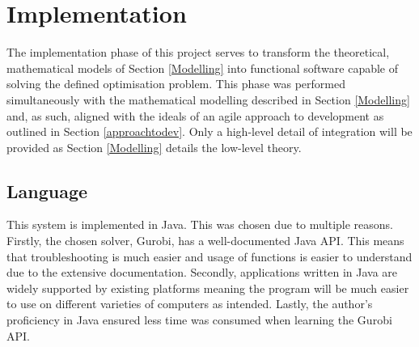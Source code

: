 \chapter{Implementation}\label{implementation}

\ifpdf
    \graphicspath{{Chapter4/Figs/Raster/}{Chapter4/Figs/PDF/}{Chapter4/Figs/}}
\else
    \graphicspath{{Chapter4/Figs/Vector/}{Chapter4/Figs/}}
\fi

The implementation phase of this project serves to transform the theoretical, mathematical models of Section \ref{Modelling} into functional software capable of solving the defined optimisation problem. This phase was performed simultaneously with the mathematical modelling described in Section \ref{Modelling} and, as such, aligned with the ideals of an agile approach to development as outlined in Section \ref{approachtodev}. Only a high-level detail of integration will be provided as Section \ref{Modelling} details the low-level theory.    

\section{Language}
This system is implemented in Java. This was chosen due to multiple reasons. Firstly, the chosen solver, Gurobi, has a well-documented Java API. This means that troubleshooting is much easier and usage of functions is easier to understand due to the extensive documentation. Secondly, applications written in Java are widely supported by existing platforms meaning the program will be much easier to use on different varieties of computers as intended. Lastly, the author's proficiency in Java ensured less time was consumed when learning the Gurobi API.

